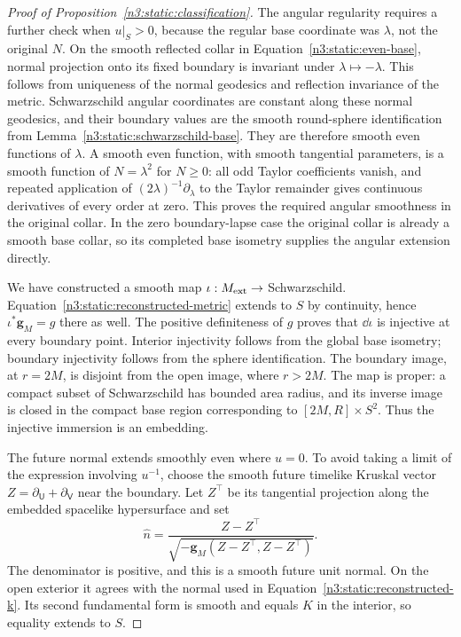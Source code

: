 \begin{proof}[Proof of Proposition~\ref{n3:static:classification}]
The angular regularity requires a further check when
\(u|_S>0\), because the regular base coordinate was \(\lambda\),
not the original \(N\).
On the smooth reflected collar in
Equation~\eqref{n3:static:even-base}, normal projection onto its fixed
boundary is invariant under \(\lambda\mapsto-\lambda\).
This follows from uniqueness of the normal geodesics and reflection
invariance of the metric.
Schwarzschild angular coordinates are constant along these normal
geodesics, and their boundary values are the smooth round-sphere
identification from Lemma~\ref{n3:static:schwarzschild-base}.
They are therefore smooth even functions of \(\lambda\).
A smooth even function, with smooth tangential parameters, is a
smooth function of \(N=\lambda^2\) for \(N\geq0\):
all odd Taylor coefficients vanish, and repeated application of
\((2\lambda)^{-1}\partial_\lambda\) to the Taylor remainder gives
continuous derivatives of every order at zero.
This proves the required angular smoothness in the original collar.
In the zero boundary-lapse case the original collar is already a
smooth base collar, so its completed base isometry supplies the
angular extension directly.

We have constructed a smooth map \(\iota:M_{\mathrm{ext}}\to\) Schwarzschild.
Equation~\eqref{n3:static:reconstructed-metric} extends to \(S\)
by continuity, hence \(\iota^*\mathbf g_M=g\) there as well.
The positive definiteness of \(g\) proves that \(\dd\iota\) is
injective at every boundary point.
Interior injectivity follows from the global base isometry;
boundary injectivity follows from the sphere identification.
The boundary image, at \(r=2M\), is disjoint from the open image,
where \(r>2M\).
The map is proper: a compact subset of Schwarzschild has bounded
area radius, and its inverse image is closed in the compact base
region corresponding to
\([2M,R]\times S^2\).
Thus the injective immersion is an embedding.

The future normal extends smoothly even where \(u=0\).
To avoid taking a limit of the expression involving \(u^{-1}\),
choose the smooth future timelike Kruskal vector
\(Z=\partial_{\mathsf U}+\partial_{\mathsf V}\) near the boundary.
Let \(Z^\top\) be its tangential projection along the embedded
spacelike hypersurface and set
\[
\widehat n=
\frac{Z-Z^\top}
{\sqrt{-\mathbf g_M(Z-Z^\top,Z-Z^\top)}}.
\]
The denominator is positive, and this is a smooth future unit
normal. On the open exterior it agrees with the normal used in
Equation~\eqref{n3:static:reconstructed-k}.
Its second fundamental form is smooth and equals \(K\) in the
interior, so equality extends to \(S\).


\end{proof}

